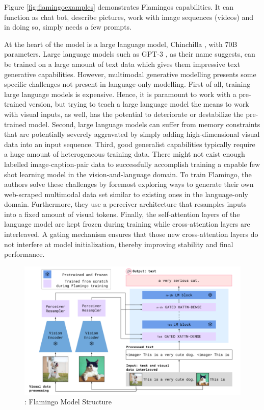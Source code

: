 \documentclass[
]{krantz}
\begin{document}
Figure \ref{fig:flamingoexamples} demonstrates Flamingos capabilities. It can function as chat bot, describe pictures, work with image sequences (videos) and in doing so, simply needs a few prompts.

At the heart of the model is a large language model, Chinchilla \citep{hoffmann2022training}, with 70B parameters. Large language models such as GPT-3 \citep{brown2020language}, as their name suggests, can be trained on a large amount of text data which gives them impressive text generative capabilities. However, multimodal generative modelling presents some specific challenges not present in language-only modelling. First of all, training large language models is expensive. Hence, it is paramount to work with a pre-trained version, but trying to teach a large language model the means to work with visual inputs, as well, has the potential to deteriorate or destabilize the pre-trained model. Second, large language models can suffer from memory constraints that are potentially severely aggravated by simply adding high-dimensional visual data into an input sequence. Third, good generalist capabilities typically require a huge amount of heterogeneous training data. There might not exist enough labelled image-caption-pair data to successfully accomplish training a capable few shot learning model in the vision-and-language domain. To train Flamingo, the authors solve these challenges by foremost exploring ways to generate their own web-scraped multimodal data set similar to existing ones in the language-only domain. Furthermore, they use a perceiver architecture \citep{jaegle2021perceiver} that resamples inputs into a fixed amount of visual tokens. Finally, the self-attention layers of the language model are kept frozen during training while cross-attention layers are interleaved. A gating mechanism ensures that those new cross-attention layers do not interfere at model initialization, thereby improving stability and final performance.

\begin{figure}

{\centering \includegraphics[width=1\linewidth]{figures/05-chapter2/flamingoarc} 

}

\caption{\citet{alayrac2022flamingo}: Flamingo Model Structure}\label{fig:flamingoarc}
\end{figure}
\end{document}

